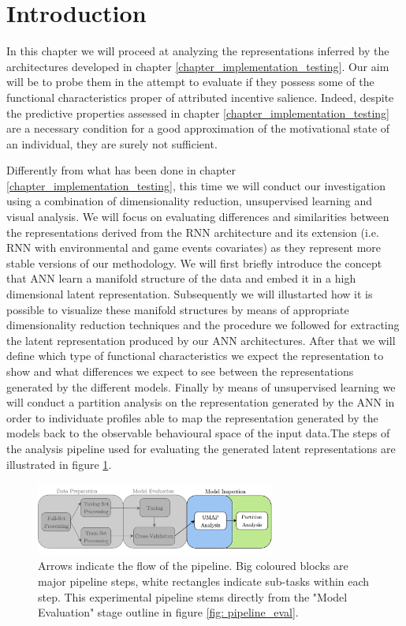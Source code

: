 \section{Introduction}
\label{representation_analysis_introduction}
In this chapter we will proceed at analyzing the representations inferred by the architectures developed in chapter \ref{chapter_implementation_testing}. Our aim will be to probe them in the attempt to evaluate if they possess some of the functional characteristics proper of attributed incentive salience. Indeed, despite the predictive properties assessed in chapter \ref{chapter_implementation_testing} are a necessary condition for a good approximation of the motivational state  of an individual, they are surely not sufficient. 

Differently from what has been done in chapter \ref{chapter_implementation_testing}, this time we will conduct our investigation using  a combination of dimensionality reduction, unsupervised learning and visual analysis. We will focus on evaluating differences and similarities between the representations derived from the RNN architecture and its extension (i.e. RNN with environmental and game events covariates) as they represent more stable versions of our methodology. We will first briefly introduce the concept that ANN learn a manifold structure of the data and embed it in a high dimensional latent representation. Subsequently we will illustarted how it is possible to visualize these manifold structures by means of appropriate dimensionality reduction techniques and the procedure we followed for extracting the latent representation produced by our ANN architectures. After that we will define which type of functional characteristics we expect the representation to show and what differences we expect to see between the representations generated by the different models. Finally by means of unsupervised learning we will conduct a partition analysis on the representation generated by the ANN in order to individuate profiles able to map the representation generated by the models back to the observable behavioural space of the input data.The steps of the analysis pipeline used for evaluating the generated latent representations are illustrated in figure \ref{fig: pipeline_inspect}.
\begin{figure}[h]
  \centering
  \includegraphics[width=0.7\textwidth]{images/chapter_4/pipeline_inspect.png}
    \caption[\textbf{Representation analysis experimental pipeline}]{Arrows indicate the flow of the pipeline. Big coloured blocks are major pipeline steps, white rectangles indicate sub-tasks within each step. This experimental pipeline stems directly from the "Model Evaluation" stage outline in figure \ref{fig: pipeline_eval}.}
    \label{fig: pipeline_inspect}
\end{figure}

